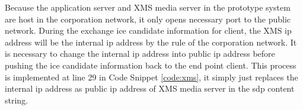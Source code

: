 \par Because the application server and XMS media server in the prototype system are host in the corporation network, it only opens necessary port to the public network. During the exchange \gls{ice} candidate information for client, the XMS \gls{ip} address will be the internal \gls{ip} address by the rule of the corporation network. It is necessary to change the internal \gls{ip} address into public \gls{ip} address before pushing the \gls{ice} candidate information back to the end point client. This process is implemented at line 29 in Code Snippet \ref{code:xms}, it simply just replaces the internal \gls{ip} address as public \gls{ip} address of XMS media server in the \gls{sdp} content string.

